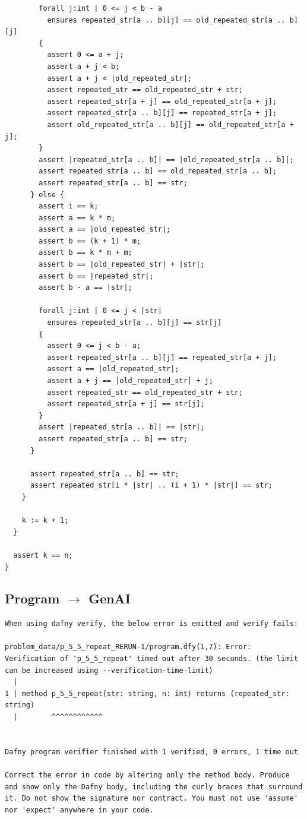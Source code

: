 \documentclass{article}
\begin{document}
\begin{lstlisting}
        forall j:int | 0 <= j < b - a
          ensures repeated_str[a .. b][j] == old_repeated_str[a .. b][j]
        {
          assert 0 <= a + j;
          assert a + j < b;
          assert a + j < |old_repeated_str|;
          assert repeated_str == old_repeated_str + str;
          assert repeated_str[a + j] == old_repeated_str[a + j];
          assert repeated_str[a .. b][j] == repeated_str[a + j];
          assert old_repeated_str[a .. b][j] == old_repeated_str[a + j];
        }
        assert |repeated_str[a .. b]| == |old_repeated_str[a .. b]|;
        assert repeated_str[a .. b] == old_repeated_str[a .. b];
        assert repeated_str[a .. b] == str;
      } else {
        assert i == k;
        assert a == k * m;
        assert a == |old_repeated_str|;
        assert b == (k + 1) * m;
        assert b == k * m + m;
        assert b == |old_repeated_str| + |str|;
        assert b == |repeated_str|;
        assert b - a == |str|;

        forall j:int | 0 <= j < |str|
          ensures repeated_str[a .. b][j] == str[j]
        {
          assert 0 <= j < b - a;
          assert repeated_str[a .. b][j] == repeated_str[a + j];
          assert a == |old_repeated_str|;
          assert a + j == |old_repeated_str| + j;
          assert repeated_str == old_repeated_str + str;
          assert repeated_str[a + j] == str[j];
        }
        assert |repeated_str[a .. b]| == |str|;
        assert repeated_str[a .. b] == str;
      }

      assert repeated_str[a .. b] == str;
      assert repeated_str[i * |str| .. (i + 1) * |str|] == str;
    }

    k := k + 1;
  }

  assert k == n;
}
\end{lstlisting}
\subsection*{Program $\rightarrow$ GenAI}
\begin{lstlisting}
When using dafny verify, the below error is emitted and verify fails:

problem_data/p_5_5_repeat_RERUN-1/program.dfy(1,7): Error: Verification of 'p_5_5_repeat' timed out after 30 seconds. (the limit can be increased using --verification-time-limit)
  |
1 | method p_5_5_repeat(str: string, n: int) returns (repeated_str: string)
  |        ^^^^^^^^^^^^


Dafny program verifier finished with 1 verified, 0 errors, 1 time out

Correct the error in code by altering only the method body. Produce and show only the Dafny body, including the curly braces that surround it. Do not show the signature nor contract. You must not use 'assume' nor 'expect' anywhere in your code.
\end{lstlisting}
\end{document}
